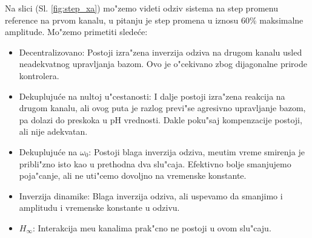 \documentclass[a4paper,11pt]{article}
\theoremstyle{definition} \newtheorem{deff}{Definicija}[section]
\theoremstyle{definition} \newtheorem{prim}[deff]{Primer}
\theoremstyle{plain} \newtheorem{teor}[deff]{Teorema}
\begin{document}
			Na slici (Sl. \ref{fig:step_xa}) mo"zemo videti odziv sistema na step promenu reference na prvom kanalu, u pitanju je step promena u iznosu 60\% maksimalne amplitude. Mo"zemo primetiti slede\'ce:
			\begin{itemize}
				\item Decentralizovano: Postoji izra"zena inverzija odziva na drugom kanalu usled neadekvatnog upravljanja bazom. Ovo je o"cekivano zbog dijagonalne prirode kontrolera.
				
				\item Dekupluju\'ce na nultoj u"cestanosti: I dalje postoji izra"zena reakcija na drugom kanalu, ali ovog puta je razlog previ"se agresivno upravljanje bazom, pa dolazi do preskoka u pH vrednosti. Dakle poku"saj kompenzacije postoji, ali nije adekvatan.
				
				\item Dekupluju\'ce na $\omega_0$: Postoji blaga inverzija odziva, me\dj{}utim vreme smirenja je pribli"zno isto kao u prethodna dva slu"caja. Efektivno bolje smanjujemo poja"canje, ali ne uti"cemo dovoljno na vremenske konstante.
				
				\item Inverzija dinamike: Blaga inverzija odziva, ali uspevamo da smanjimo i amplitudu i vremenske konstante u odzivu.
				
				\item $H_{\infty}$: Interakcija me\dj{}u kanalima prak"cno ne postoji u ovom slu"caju.
				
			\end{itemize}
			\clearpage
\end{document}
